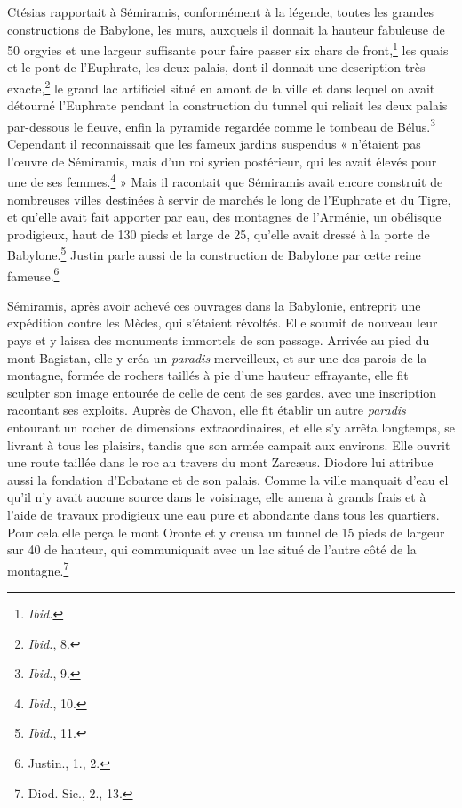 \documentclass[a4paper, 11pt, oneside, landscape]{article}
\begin{document}
Ctésias rapportait à Sémiramis, conformément à la légende, toutes les grandes constructions de Babylone, les murs, auxquels il donnait la hauteur fabuleuse de 50 orgyies et une largeur suffisante pour faire passer six chars de front,\footnote{\emph{Ibid.}} les quais et le pont de l'Euphrate, les deux palais, dont il donnait une description très-exacte,\footnote{\emph{Ibid.}, 8.} le grand lac artificiel situé en amont de la ville et dans lequel on avait détourné l'Euphrate pendant la construction du tunnel qui reliait les deux palais par-dessous le fleuve, enfin la pyramide regardée comme le tombeau de Bélus.\footnote{\emph{Ibid.}, 9.} Cependant il reconnaissait que les fameux jardins suspendus « n'étaient pas l'œuvre de Sémiramis, mais d'un roi syrien postérieur, qui les avait élevés pour une de ses femmes.\footnote{\emph{Ibid.}, 10.} » Mais il racontait que Sémiramis avait encore construit de nombreuses villes destinées à servir de marchés le long de l'Euphrate et du Tigre, et qu'elle avait fait apporter par eau, des montagnes de l'Arménie, un obélisque prodigieux, haut de 130 pieds et large de 25, qu'elle avait dressé à la porte de Babylone.\footnote{\emph{Ibid.}, 11.} Justin parle aussi de la construction de Babylone par cette reine fameuse.\footnote{Justin., 1., 2.}

Sémiramis, après avoir achevé ces ouvrages dans la Babylonie, entreprit une expédition contre les Mèdes, qui s'étaient révoltés. Elle soumit de nouveau leur pays et y laissa des monuments immortels de son passage. Arrivée au pied du mont Bagistan, elle y créa un \emph{paradis} merveilleux, et sur une des parois de la montagne, formée de rochers taillés à pie d'une hauteur effrayante, elle fit sculpter son image entourée de celle de cent de ses gardes, avec une inscription racontant ses exploits. Auprès de Chavon, elle fit établir un autre \emph{paradis} entourant un rocher de dimensions extraordinaires, et elle s'y arrêta longtemps, se livrant à tous les plaisirs, tandis que son armée campait aux environs. Elle ouvrit une route taillée dans le roc au travers du mont Zarcæus. Diodore lui attribue aussi la fondation d'Ecbatane et de son palais. Comme la ville manquait d'eau el qu'il n'y avait aucune source dans le voisinage, elle amena à grands frais et à l'aide de travaux prodigieux une eau pure et abondante dans tous les quartiers. Pour cela elle perça le mont Oronte et y creusa un tunnel de 15 pieds de largeur sur 40 de hauteur, qui communiquait avec un lac situé de l'autre côté de la montagne.\footnote{Diod. Sic., 2., 13.}
\end{document}
